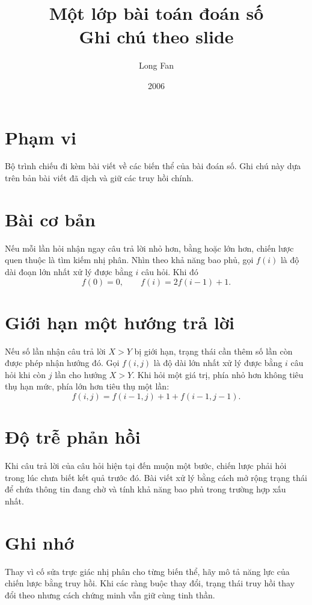 \documentclass[11pt]{article}
\title{Một lớp bài toán đoán số\\{\large Ghi chú theo slide}}
\author{Long Fan}
\date{2006}
\begin{document}
\maketitle


\section{Phạm vi}

Bộ trình chiếu đi kèm bài viết về các biến thể của bài đoán số. Ghi chú này
dựa trên bản bài viết đã dịch và giữ các truy hồi chính.

\section{Bài cơ bản}

Nếu mỗi lần hỏi nhận ngay câu trả lời nhỏ hơn, bằng hoặc lớn hơn, chiến lược
quen thuộc là tìm kiếm nhị phân. Nhìn theo khả năng bao phủ, gọi \(f(i)\) là
độ dài đoạn lớn nhất xử lý được bằng \(i\) câu hỏi. Khi đó
\[
  f(0)=0,\qquad f(i)=2f(i-1)+1.
\]

\section{Giới hạn một hướng trả lời}

Nếu số lần nhận câu trả lời \(X>Y\) bị giới hạn, trạng thái cần thêm số lần
còn được phép nhận hướng đó. Gọi \(f(i,j)\) là độ dài lớn nhất xử lý được bằng
\(i\) câu hỏi khi còn \(j\) lần cho hướng \(X>Y\). Khi hỏi một giá trị, phía
nhỏ hơn không tiêu thụ hạn mức, phía lớn hơn tiêu thụ một lần:
\[
  f(i,j)=f(i-1,j)+1+f(i-1,j-1).
\]

\section{Độ trễ phản hồi}

Khi câu trả lời của câu hỏi hiện tại đến muộn một bước, chiến lược phải hỏi
trong lúc chưa biết kết quả trước đó. Bài viết xử lý bằng cách mở rộng trạng
thái để chứa thông tin đang chờ và tính khả năng bao phủ trong trường hợp xấu
nhất.

\section{Ghi nhớ}

Thay vì cố sửa trực giác nhị phân cho từng biến thể, hãy mô tả năng lực của
chiến lược bằng truy hồi. Khi các ràng buộc thay đổi, trạng thái truy hồi thay
đổi theo nhưng cách chứng minh vẫn giữ cùng tinh thần.
\end{document}
